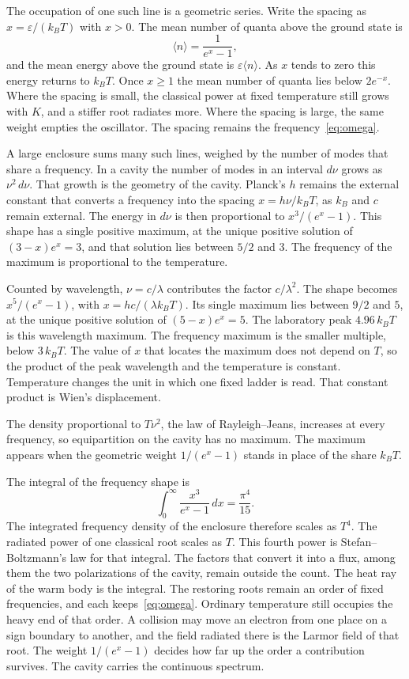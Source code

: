 \documentclass[a4paper]{article}
\begin{document}
The occupation of one such line is a geometric series. Write the spacing as \(x=\varepsilon/(k_B T)\) with \(x>0\). The mean number of quanta above the ground state is
\[
\langle n\rangle=\frac{1}{e^{x}-1},
\]
and the mean energy above the ground state is \(\varepsilon\langle n\rangle\). As \(x\) tends to zero this energy returns to \(k_B T\). Once \(x\ge 1\) the mean number of quanta lies below \(2e^{-x}\). Where the spacing is small, the classical power at fixed temperature still grows with \(K\), and a stiffer root radiates more. Where the spacing is large, the same weight empties the oscillator. The spacing remains the frequency~\eqref{eq:omega}.

A large enclosure sums many such lines, weighed by the number of modes that share a frequency. In a cavity the number of modes in an interval \(d\nu\) grows as \(\nu^{2}\,d\nu\). That growth is the geometry of the cavity. Planck's \(h\) remains the external constant that converts a frequency into the spacing \(x=h\nu/k_B T\), as \(k_B\) and \(c\) remain external. The energy in \(d\nu\) is then proportional to \(x^{3}/(e^{x}-1)\). This shape has a single positive maximum, at the unique positive solution of \((3-x)e^{x}=3\), and that solution lies between \(5/2\) and \(3\). The frequency of the maximum is proportional to the temperature.

Counted by wavelength, \(\nu=c/\lambda\) contributes the factor \(c/\lambda^{2}\). The shape becomes \(x^{5}/(e^{x}-1)\), with \(x=hc/(\lambda k_B T)\). Its single maximum lies between \(9/2\) and \(5\), at the unique positive solution of \((5-x)e^{x}=5\). The laboratory peak \(4.96\,k_B T\) is this wavelength maximum. The frequency maximum is the smaller multiple, below \(3\,k_B T\). The value of \(x\) that locates the maximum does not depend on \(T\), so the product of the peak wavelength and the temperature is constant. Temperature changes the unit in which one fixed ladder is read. That constant product is Wien's displacement.

The density proportional to \(T\nu^{2}\), the law of Rayleigh--Jeans, increases at every frequency, so equipartition on the cavity has no maximum. The maximum appears when the geometric weight \(1/(e^{x}-1)\) stands in place of the share \(k_B T\).

The integral of the frequency shape is
\[
\int_{0}^{\infty}\frac{x^{3}}{e^{x}-1}\,dx=\frac{\pi^{4}}{15}.
\]
The integrated frequency density of the enclosure therefore scales as \(T^{4}\). The radiated power of one classical root scales as \(T\). This fourth power is Stefan--Boltzmann's law for that integral. The factors that convert it into a flux, among them the two polarizations of the cavity, remain outside the count. The heat ray of the warm body is the integral. The restoring roots remain an order of fixed frequencies, and each keeps~\eqref{eq:omega}. Ordinary temperature still occupies the heavy end of that order. A collision may move an electron from one place on a sign boundary to another, and the field radiated there is the Larmor field of that root. The weight \(1/(e^{x}-1)\) decides how far up the order a contribution survives. The cavity carries the continuous spectrum.
\end{document}
